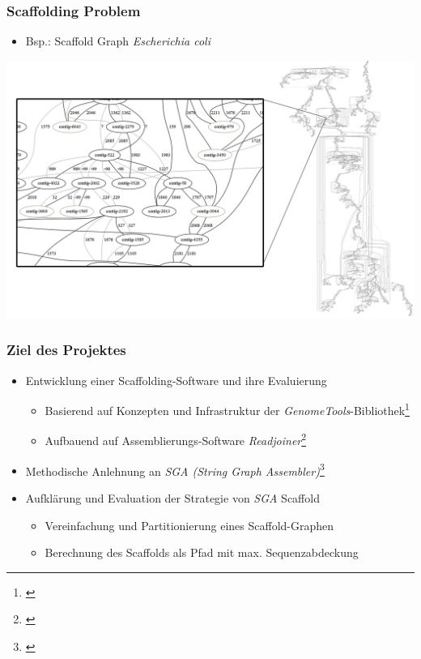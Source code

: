 \documentclass[xcolor=pst]{beamer}
\begin{document}
\begin{frame}
  \frametitle{Scaffolding Problem}
  \begin{itemize}
    \item Bsp.: Scaffold Graph \textit{Escherichia coli}
  \end{itemize}
  \begin{center}
    \includegraphics[width=\textwidth,height=\textheight,keepaspectratio]{figures/Scaffolding_graph.png}
  \end{center}
\end{frame}

\begin{frame}
  \frametitle{Ziel des Projektes}
  \begin{itemize}
  \item Entwicklung einer Scaffolding-Software und ihre Evaluierung
  \begin{itemize}
    \item Basierend auf Konzepten und Infrastruktur der \textit{GenomeTools}-Bibliothek\footnote{\cite{Gremme:2013}}
    \item Aufbauend auf Assemblierungs-Software \textit{Readjoiner}\footnote{\cite{Gonnella:2012gn}}
  \end{itemize}
  \item Methodische Anlehnung an \textit{SGA (String Graph Assembler)}\footnote{\cite{Simpson:2012ef}}
  \item Aufklärung und Evaluation der Strategie von \textit{SGA} Scaffold
  \begin{itemize}
    \item Vereinfachung und Partitionierung eines Scaffold-Graphen
    \item Berechnung des Scaffolds als Pfad mit max. Sequenzabdeckung
  \end{itemize}
  \end{itemize}
\end{frame}
\end{document}
